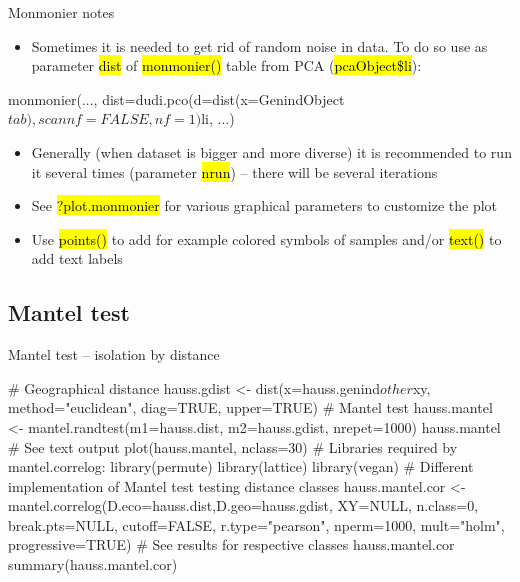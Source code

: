 \documentclass[compress, ucs, xelatex, 11pt, xcolor=svgnames,
  hyperref={
    bookmarks=true,
    unicode=true,
    colorlinks=true,
    pdftitle={Molecular data in R},
    plainpages=false,
    pdfauthor={Vojtech Zeisek},
    pdfsubject={Course about phylogeny and evolution in R},
    pdfcreator={XeLaTeX},
    pdfkeywords={R, evolution, phylogeny, molecular data},
    linkcolor=Tomato,
    anchorcolor=SaddleBrown,
    citecolor=Goldenrod,
    filecolor=DarkMagenta,
    menucolor=Sienna,
    urlcolor=DarkTurquoise,
    pdftex},
  url={hyphens, lowtilde} %
  ]{beamer}
\renewcommand{\texttt}[1]{\hl{\ttfamily #1}}
\begin{document}
\begin{frame}[fragile]{Monmonier notes}
\begin{itemize}
 \item Sometimes it is needed to get rid of random noise in data. To do so use as parameter \texttt{dist} of \texttt{monmonier()} table from PCA (\texttt{pcaObject\$li}):
\end{itemize}
  \begin{spluscode}
    monmonier(..., dist=dudi.pco(d=dist(x=GenindObject$tab),
      scannf=FALSE, nf=1)$li, ...)
  \end{spluscode}
\begin{itemize}
 \item Generally (when dataset is bigger and more diverse) it is recommended to run it several times (parameter \texttt{nrun}) -- there will be several iterations
 \item See \texttt{?plot.monmonier} for various graphical parameters to customize the plot
 \item Use \texttt{points()} to add for example colored symbols of samples and/or \texttt{text()} to add text labels
\end{itemize}
\end{frame}

\subsection{Mantel test}

\begin{frame}[fragile]{Mantel test -- isolation by distance}
  \begin{spluscode}
    # Geographical distance
    hauss.gdist <- dist(x=hauss.genind$other$xy, method="euclidean",
      diag=TRUE, upper=TRUE)
    # Mantel test
    hauss.mantel <- mantel.randtest(m1=hauss.dist, m2=hauss.gdist,
      nrepet=1000)
    hauss.mantel # See text output
    plot(hauss.mantel, nclass=30)
    # Libraries required by mantel.correlog:
    library(permute)
    library(lattice)
    library(vegan)
    # Different implementation of Mantel test testing distance classes
    hauss.mantel.cor <- mantel.correlog(D.eco=hauss.dist,D.geo=hauss.gdist,
      XY=NULL, n.class=0, break.pts=NULL, cutoff=FALSE, r.type="pearson",
      nperm=1000, mult="holm", progressive=TRUE)
    # See results for respective classes
    hauss.mantel.cor
    summary(hauss.mantel.cor)
  \end{spluscode}
\end{frame}
\end{document}

